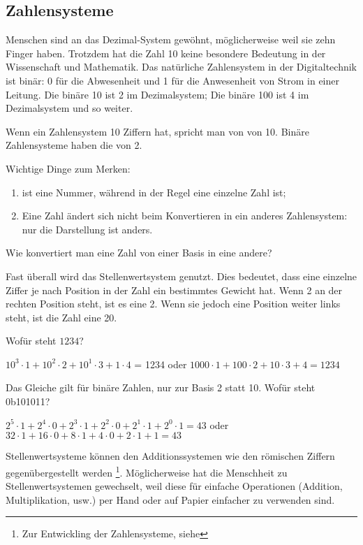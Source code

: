 \subsection{Zahlensysteme}

Menschen sind an das Dezimal-System gewöhnt, möglicherweise weil sie zehn Finger haben.
Trotzdem hat die Zahl 10 keine besondere Bedeutung in der Wissenschaft und Mathematik.
Das natürliche Zahlensystem in der Digitaltechnik ist binär: 0 für die Abwesenheit und 1 für die Anwesenheit von
Strom in einer Leitung. Die binäre 10 ist 2 im Dezimalsystem; Die binäre 100 ist 4 im Dezimalsystem und so weiter.

Wenn ein Zahlensystem 10 Ziffern hat, spricht man von  von 10.
Binäre Zahlensysteme haben die  von 2.

Wichtige Dinge zum Merken:
\begin{enumerate}
\item {} ist eine Nummer, während  in der Regel eine einzelne Zahl ist;
\item Eine Zahl ändert sich nicht beim Konvertieren in ein anderes Zahlensystem: nur die Darstellung ist anders.
\end{enumerate}

Wie konvertiert man eine Zahl von einer Basis in eine andere?

Fast überall wird das Stellenwertsystem genutzt. Dies bedeutet, dass eine einzelne Ziffer je nach Position in der Zahl ein bestimmtes Gewicht hat.
Wenn 2 an der rechten Position steht, ist es eine 2.
Wenn sie jedoch eine Position weiter links steht, ist die Zahl eine 20.

Wofür steht $1234$?

$10^3 \cdot 1 + 10^2 \cdot 2 + 10^1 \cdot 3 + 1 \cdot 4$ = 1234 oder 
$1000 \cdot 1 + 100 \cdot 2 + 10 \cdot 3 + 4 = 1234$

Das Gleiche gilt für binäre Zahlen, nur zur Basis 2 statt 10.
Wofür steht 0b101011?

$2^5 \cdot 1 + 2^4 \cdot 0 + 2^3 \cdot 1 + 2^2 \cdot 0 + 2^1 \cdot 1 + 2^0 \cdot 1 = 43$ oder
$32 \cdot 1 + 16 \cdot 0 + 8 \cdot 1 + 4 \cdot 0 + 2 \cdot 1 + 1 = 43$

Stellenwertsysteme können den Additionssystemen wie den römischen Ziffern gegenübergestellt werden
\footnote{Zur Entwickling der Zahlensysteme, siehe }.
Möglicherweise hat die Menschheit zu Stellenwertsystemen gewechselt, weil diese für einfache Operationen (Addition, Multiplikation, usw.)
per Hand oder auf Papier einfacher zu verwenden sind.

